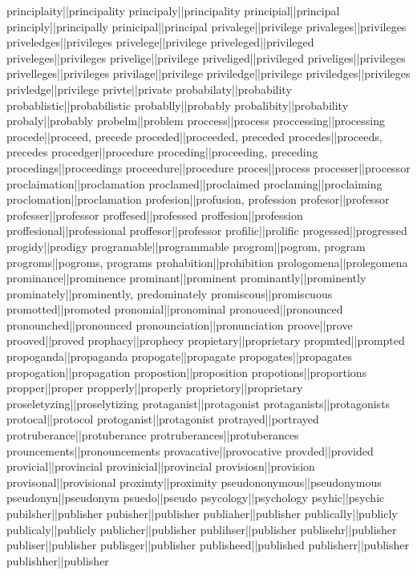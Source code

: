 principlaity||principality
principaly||principality
principial||principal
principly||principally
prinicipal||principal
privalege||privilege
privaleges||privileges
priveledges||privileges
privelege||privilege
priveleged||privileged
priveleges||privileges
privelige||privilege
priveliged||privileged
priveliges||privileges
privelleges||privileges
privilage||privilege
priviledge||privilege
priviledges||privileges
privledge||privilege
privte||private
probabilaty||probability
probablistic||probabilistic
probablly||probably
probalibity||probability
probaly||probably
probelm||problem
proccess||process
proccessing||processing
procede||proceed, precede
proceded||proceeded, preceded
procedes||proceeds, precedes
procedger||procedure
proceding||proceeding, preceding
procedings||proceedings
proceedure||procedure
proces||process
processer||processor
proclaimation||proclamation
proclamed||proclaimed
proclaming||proclaiming
proclomation||proclamation
profesion||profusion, profession
profesor||professor
professer||professor
proffesed||professed
proffesion||profession
proffesional||professional
proffesor||professor
profilic||prolific
progessed||progressed
progidy||prodigy
programable||programmable
progrom||pogrom, program
progroms||pogroms, programs
prohabition||prohibition
prologomena||prolegomena
prominance||prominence
prominant||prominent
prominantly||prominently
prominately||prominently, predominately
promiscous||promiscuous
promotted||promoted
pronomial||pronominal
pronouced||pronounced
pronounched||pronounced
pronounciation||pronunciation
proove||prove
prooved||proved
prophacy||prophecy
propietary||proprietary
propmted||prompted
propoganda||propaganda
propogate||propagate
propogates||propagates
propogation||propagation
propostion||proposition
propotions||proportions
propper||proper
propperly||properly
proprietory||proprietary
proseletyzing||proselytizing
protaganist||protagonist
protaganists||protagonists
protocal||protocol
protoganist||protagonist
protrayed||portrayed
protruberance||protuberance
protruberances||protuberances
prouncements||pronouncements
provacative||provocative
provded||provided
provicial||provincial
provinicial||provincial
provisiosn||provision
provisonal||provisional
proximty||proximity
pseudononymous||pseudonymous
pseudonyn||pseudonym
psuedo||pseudo
psycology||psychology
psyhic||psychic
pubilsher||publisher
pubisher||publisher
publiaher||publisher
publically||publicly
publicaly||publicly
publicher||publisher
publihser||publisher
publisehr||publisher
publiser||publisher
publisger||publisher
publisheed||published
publisherr||publisher
publishher||publisher
